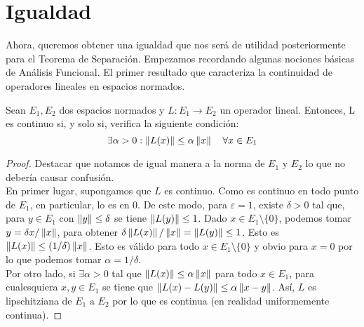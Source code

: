 \chapter{Igualdad}
\newcommand{\normSpace}{E}
	
Ahora, queremos obtener una igualdad que nos será de utilidad posteriormente para el Teorema de Separación. Empezamos recordando algunas nociones básicas de Análisis Funcional. El primer resultado que caracteriza la continuidad de operadores lineales en espacios normados.
	
\begin{proposicionBox}\label{caracCont}
Sean $ \normSpace_1, \normSpace_2 $ dos espacios normados y $ L:\normSpace_1 \longrightarrow \normSpace_2 $ un operador lineal. Entonces, L es continuo si, y solo si, verifica la siguiente condición:
\[
\exists \alpha > 0 : \norm{L(x)} \leq \alpha \norm{x} \quad \forall x \in \normSpace_1
\]
\end{proposicionBox}
\begin{proof}
Destacar que notamos de igual manera a la norma de $ \normSpace_1 \text{ y } \normSpace_2$ lo que no debería causar confusión.\\

En primer lugar, supongamos que $ L $ es continuo. Como es continuo en todo punto de $ \normSpace_1 $, en particular, lo es en 0. De este modo, para $ \varepsilon = 1 $, existe $ \delta >0  $  tal que, para $ y \in \normSpace_1 $ con $ \left\Vert y\right\Vert \leq \delta$ se tiene $ \left\Vert L(y)\right\Vert \leq 1 $. Dado $ x \in \normSpace_1 \setminus \{0\} $, podemos tomar $ y = \delta x / \left\Vert x\right\Vert $, para obtener $ \delta \left\Vert L(x)\right\Vert / \left\Vert x\right\Vert = \left\Vert L(y)\right\Vert \leq 1 $. Esto es $ \left\Vert L(x)\right\Vert \leq (1/\delta) \left\Vert x\right\Vert $. Esto es válido para todo $ x \in \normSpace_1 \setminus \{0\} $ y obvio para $ x = 0 $ por lo que podemos tomar $ \alpha = 1/\delta $. \\

Por otro lado, si $ \exists \alpha > 0 $ tal que  $ \left\Vert L(x)\right\Vert \leq \alpha \left\Vert x\right\Vert $ para todo $ x \in \normSpace_1 $, para cualesquiera $ x,y \in \normSpace_1 $ se tiene que $ \left\Vert L(x) - L(y)\right\Vert \leq \alpha \left\Vert x-y\right\Vert $. Así, $ L $ es lipschitziana de $ \normSpace_1 \text{ a } \normSpace_2$ por lo que es continua (en realidad uniformemente continua).
\end{proof}

